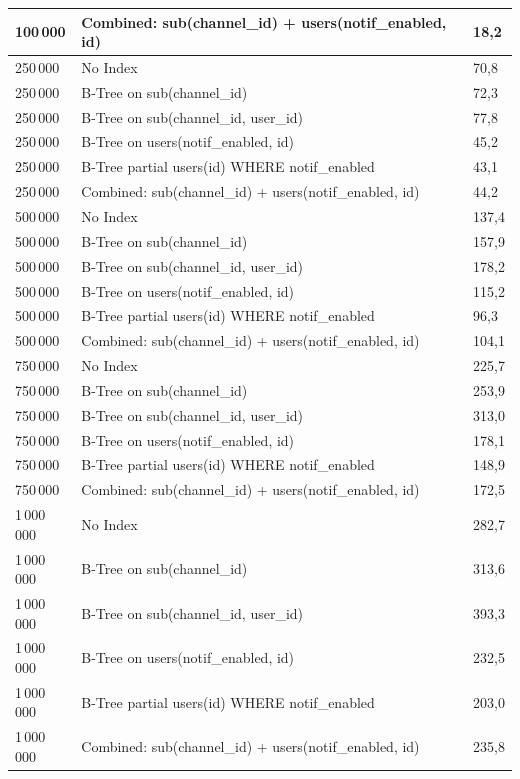\begin{longtable}{|p{2.4cm}|p{9.9cm}|p{2.3cm}|}
    100\,000 & Combined: sub(channel\_id) + users(notif\_enabled, id) & 18,2 \\
    \hline
    250\,000 & No Index & 70,8 \\
    \hline
    250\,000 & B-Tree on sub(channel\_id) & 72,3 \\
    \hline
    250\,000 & B-Tree on sub(channel\_id, user\_id) & 77,8 \\
    \hline
    250\,000 & B-Tree on users(notif\_enabled, id) & 45,2 \\
    \hline
    250\,000 & B-Tree partial users(id) WHERE notif\_enabled & 43,1 \\
    \hline
    250\,000 & Combined: sub(channel\_id) + users(notif\_enabled, id) & 44,2 \\
    \hline
    500\,000 & No Index & 137,4 \\
    \hline
    500\,000 & B-Tree on sub(channel\_id) & 157,9 \\
    \hline
    500\,000 & B-Tree on sub(channel\_id, user\_id) & 178,2 \\
    \hline
    500\,000 & B-Tree on users(notif\_enabled, id) & 115,2 \\
    \hline
    500\,000 & B-Tree partial users(id) WHERE notif\_enabled & 96,3 \\
    \hline
    500\,000 & Combined: sub(channel\_id) + users(notif\_enabled, id) & 104,1 \\
    \hline
    750\,000 & No Index & 225,7 \\
    \hline
    750\,000 & B-Tree on sub(channel\_id) & 253,9 \\
    \hline
    750\,000 & B-Tree on sub(channel\_id, user\_id) & 313,0 \\
    \hline
    750\,000 & B-Tree on users(notif\_enabled, id) & 178,1 \\
    \hline
    750\,000 & B-Tree partial users(id) WHERE notif\_enabled & 148,9 \\
    \hline
    750\,000 & Combined: sub(channel\_id) + users(notif\_enabled, id) & 172,5 \\
    \hline
    1\,000\,000 & No Index & 282,7 \\
    \hline
    1\,000\,000 & B-Tree on sub(channel\_id) & 313,6 \\
    \hline
    1\,000\,000 & B-Tree on sub(channel\_id, user\_id) & 393,3 \\
    \hline
    1\,000\,000 & B-Tree on users(notif\_enabled, id) & 232,5 \\
    \hline
    1\,000\,000 & B-Tree partial users(id) WHERE notif\_enabled & 203,0 \\
    \hline
    1\,000\,000 & Combined: sub(channel\_id) + users(notif\_enabled, id) & 235,8 \\
    \hline
\end{longtable}

